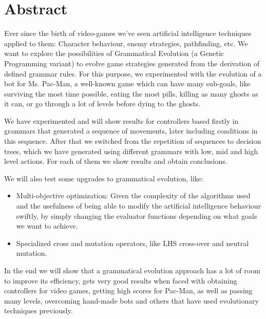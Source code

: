 \chapter{Abstract}
Ever since the birth of video-games we’ve seen artificial intelligence techniques applied to them: Character behaviour, enemy strategies, pathfinding, etc. We want to explore the possibilities of Grammatical Evolution (a Genetic Programming variant) to evolve game strategies generated from the derivation of defined grammar rules. For this purpose, we experimented with the evolution of a bot for Ms. Pac-Man, a well-known game which can have many sub-goals, like surviving the most time possible, eating the most pills, killing as many ghosts as it can, or go through a lot of levels before dying to the ghosts.
 
We have experimented and will show results for controllers based firstly in grammars that generated a sequence of movements, later including conditions in this sequence.
After that we switched from the repetition of sequences to decision trees, which we have generated using different grammars with low, mid and high level actions. For each of them we show results and obtain conclusions.
 
We will also test some upgrades to grammatical evolution, like:
\begin{itemize}
\item Multi-objective optimization: Given the complexity of the algorithms used and the usefulness of being able to modify the artificial intelligence behaviour swiftly, by simply changing the evaluator functions depending on what goals we want to achieve.
\item Specialized cross and mutation operators, like LHS cross-over and neutral mutation.
\end{itemize}
 
In the end we will show that a grammatical evolution approach has a lot of room to improve its efficiency, gets very good results when faced with obtaining controllers for video games, getting high scores for Pac-Man, as well as passing many levels, overcoming hand-made bots and others that have used evolutionary techniques previously.
